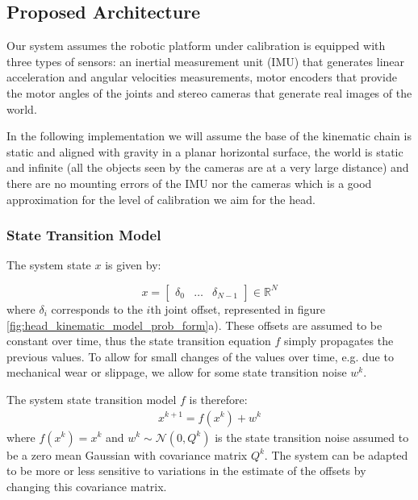 \subsection{Proposed Architecture}

Our system assumes the robotic platform under calibration is equipped with three types of sensors: an inertial measurement unit (IMU) that generates linear acceleration and angular velocities measurements, motor encoders that provide the motor angles of the joints and stereo cameras that generate real images of the world. %

In the following implementation we will assume the base of the kinematic chain is static and aligned with gravity in a planar horizontal surface, the world is static and infinite (all the objects seen by the cameras are at a very large distance) and there are no mounting errors of the IMU nor the cameras which is a good approximation for the level of calibration we aim for the head.

\subsubsection{State Transition Model}

The system state $x$ is given by:

\begin{equation}
x=\left[\begin{array}{ccc}
\delta_{0} & \ldots & \delta_{N-1}\end{array}\right]\in\mathbb{R}^{N}
\end{equation}
where $\delta_{i}$ corresponds to the $i$th joint offset, represented in figure \ref{fig:head_kinematic_model_prob_form}a). These offsets are assumed to be constant over time, thus the state transition equation $f$ simply propagates the previous values. To allow for small changes of the values over time, e.g. due to mechanical wear or slippage, we allow for some state transition noise $w^k$.

The system state transition model $f$ is therefore:
%
\begin{equation}
\begin{array}{c}
x^{k+1}=f\left(x^{k}\right)+w^{k}
\end{array}
\label{eq:F}
\end{equation}
%
where $f\left(x^{k}\right)=x^{k}$ and $w^k\sim \mathcal{N}\left(0,Q^k\right)$ is the state transition noise assumed to be a zero mean Gaussian with covariance matrix $Q^k$. The system can be adapted to be more or less sensitive to variations in the estimate of the offsets by changing this covariance matrix.

